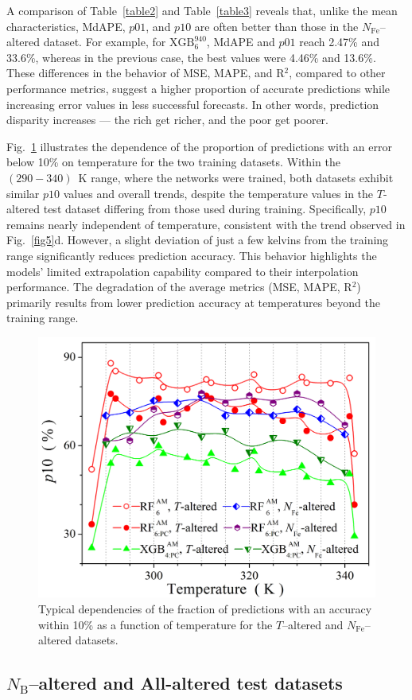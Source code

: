 \documentclass[a4paper,fleqn]{cas-sc}
\begin{document}
A comparison of Table~\ref{table2} and Table~\ref{table3} reveals that,
unlike the mean characteristics, MdAPE, $p01$, and $p10$ are often better than those in the $N_\mathrm{Fe}$--altered dataset.
For example, for $\mathrm{XGB}^{940}_{6}$, MdAPE and $p01$ reach 2.47\% and 33.6\%,
whereas in the previous case, the best values were 4.46\% and 13.6\%.
These differences in the behavior of MSE, MAPE, and R$^2$, compared to other performance metrics,
suggest a higher proportion of accurate predictions while increasing error values in less successful forecasts.
In other words, prediction disparity increases ---
the rich get richer, and the poor get poorer.

Fig.~\ref{fig10} illustrates the dependence of the proportion of predictions with an error below 10\% on temperature for the two training datasets.
Within the $(290-340)$~K range, where the networks were trained, both datasets exhibit similar $p10$ values and overall trends,
despite the temperature values in the $T$-altered test dataset differing from those used during training.
Specifically, $p10$ remains nearly independent of temperature, consistent with the trend observed in Fig.~\ref{fig5}d.
However, a slight deviation of just a few kelvins from the training range significantly reduces prediction accuracy.
This behavior highlights the models' limited extrapolation capability compared to their interpolation performance.
The degradation of the average metrics (MSE, MAPE, R$^2$) primarily results from lower prediction accuracy at temperatures beyond the training range.

\begin{figure}
  \centering
     \includegraphics[width=0.5\linewidth]{Fig10.png}
    \caption{Typical dependencies of the fraction of predictions with an accuracy within 10\%
    as a function of temperature for the $T$--altered and $N_\mathrm{Fe}$--altered datasets.
}\label{fig10}
\end{figure}


\subsection{$N_\mathrm{B}$--altered and All-altered test datasets}
\end{document}
